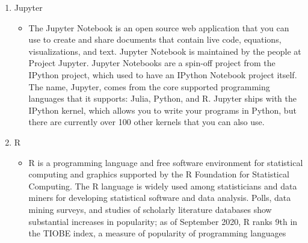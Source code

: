 \documentclass[conference]{IEEEtran}
\begin{document}
\begin{enumerate}
\begin{itemize}
        
        \end{itemize}
        
         \item  Jupyter
        \begin{itemize}

            \item The Jupyter Notebook is an open source web application that you can use to create and share documents that contain live code, equations, visualizations, and text. Jupyter Notebook is maintained by the people at Project Jupyter.
            Jupyter Notebooks are a spin-off project from the IPython project, which used to have an IPython Notebook project itself. The name, Jupyter, comes from the core supported programming languages that it supports: Julia, Python, and R. Jupyter ships with the IPython kernel, which allows you to write your programs in Python, but there are currently over 100 other kernels that you can also use.
        
        \end{itemize}
        
         \item  R
        \begin{itemize}

            \item R is a programming language and free software environment for statistical computing and graphics supported by the R Foundation for Statistical Computing. The R language is widely used among statisticians and data miners for developing statistical software and data analysis. Polls, data mining surveys, and studies of scholarly literature databases show substantial increases in popularity; as of September 2020, R ranks 9th in the TIOBE index, a measure of popularity of programming languages
            
        \end{itemize}
\end{enumerate}
\end{document}

